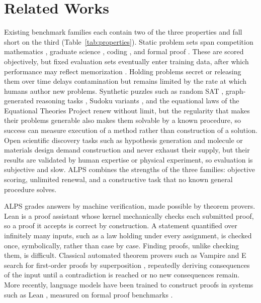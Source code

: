 \documentclass[letterpaper]{article} %
\begin{document}
\section{Related Works}

Existing benchmark families each contain two of the three properties and fall short on the third (Table~\ref{tab:properties}). Static problem sets span competition mathematics \citep{cobbe2021training, hendrycks2021measuring}, graduate science \citep{rein2023gpqa}, coding \citep{chen2021evaluating}, and formal proof \citep{zheng2021minif2f, azerbayev2023proofnet, tsoukalas2024putnambench}. These are scored objectively, but fixed evaluation sets eventually enter training data, after which performance may reflect memorization \citep{xu2024benchmark, chen2025recent}. Holding problems secret \citep{glazer2024frontiermath} or releasing them over time \citep{white2025livebench, jain2025livecodebench} delays contamination but remains limited by the rate at which humans author new problems. Synthetic puzzles such as random SAT \citep{selman1996generating}, graph-generated reasoning tasks \citep{zhu2024dyval}, Sudoku variants \citep{seely2025sudoku}, and the equational laws of the Equational Theories Project \citep{bolan2025equational} renew without limit, but the regularity that makes their problems generable also makes them solvable by a known procedure, so success can measure execution of a method rather than construction of a solution. Open scientific discovery tasks such as hypothesis generation and molecule or materials design \citep{lu2024ai, gottweis2026accelerating, alkan2025survey, romera2024mathematical, merchant2023scaling, jumper2021highly} demand construction and never exhaust their supply, but their results are validated by human expertise or physical experiment, so evaluation is subjective and slow. ALPS combines the strengths of the three families: objective scoring, unlimited renewal, and a constructive task that no known general procedure solves.

ALPS grades answers by machine verification, made possible by theorem provers. Lean \citep{moura2021lean} is a proof assistant whose kernel mechanically checks each submitted proof, so a proof it accepts is correct by construction. A statement quantified over infinitely many inputs, such as a law holding under every assignment, is checked once, symbolically, rather than case by case. Finding proofs, unlike checking them, is difficult. Classical automated theorem provers such as Vampire and E \citep{kovacs2013first, schulz2019faster} search for first-order proofs by superposition \citep{bachmair1994rewrite}, repeatedly deriving consequences of the input until a contradiction is reached or no new consequences remain. More recently, language models have been trained to construct proofs in systems such as Lean \citep{yang2023leandojo, xin2024deepseek, hubert2026olympiad}, measured on formal proof benchmarks \citep{zheng2021minif2f}.
\end{document}
